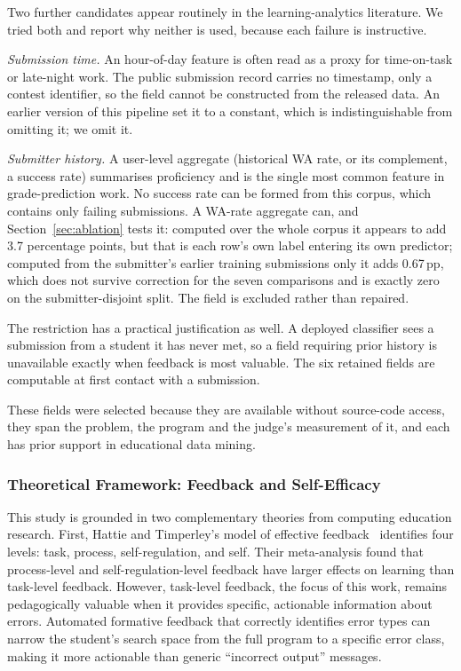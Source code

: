 \documentclass[acmsmall]{acmart}
\begin{document}
Two further candidates appear routinely in the learning-analytics literature.
We tried both and report why neither is used, because each failure is
instructive.

\emph{Submission time.} An hour-of-day feature is often read as a proxy for
time-on-task or late-night work. The public submission record carries no
timestamp, only a contest identifier, so the field cannot be constructed from
the released data. An earlier version of this pipeline set it to a constant,
which is indistinguishable from omitting it; we omit it.

\emph{Submitter history.} A user-level aggregate (historical WA rate, or its
complement, a success rate) summarises proficiency and is the single most common
feature in grade-prediction work. No success rate can be formed from this
corpus, which contains only failing submissions. A WA-rate aggregate can, and
Section~\ref{sec:ablation} tests it: computed over the whole corpus it appears
to add 3.7 percentage points, but that is each row's own label entering its own
predictor; computed from the submitter's earlier training submissions only it
adds 0.67\,pp, which does not survive correction for the seven comparisons and
is exactly zero on the submitter-disjoint split. The field is excluded rather
than repaired.

The restriction has a practical justification as well. A deployed classifier
sees a submission from a student it has never met, so a field requiring prior
history is unavailable exactly when feedback is most valuable. The six retained
fields are computable at first contact with a submission.

These fields were selected because they are available without source-code
access, they span the problem, the program and the judge's measurement of it,
and each has prior support in educational data mining.

\subsubsection*{Theoretical Framework: Feedback and Self-Efficacy}

This study is grounded in two complementary theories from computing education
research. First, Hattie and Timperley's model of effective
feedback~\cite{hattie2007power} identifies four levels: task, process,
self-regulation, and self. Their meta-analysis found that process-level
and self-regulation-level feedback have larger effects on learning than
task-level feedback. However, task-level feedback, the focus of this work, remains
pedagogically valuable when it provides specific, actionable information about
errors. Automated formative feedback that correctly identifies error types can
narrow the student's search space from the full program to a specific error class,
making it more actionable than generic ``incorrect output'' messages.
\end{document}
